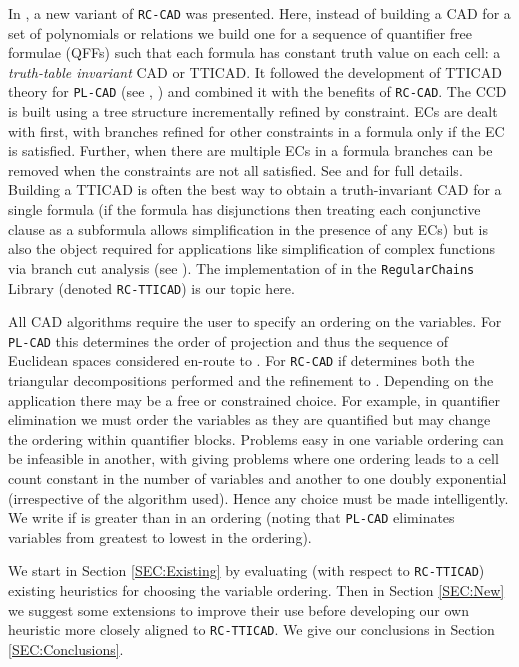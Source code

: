 \documentclass[runningheads,a4paper]{llncs}
\begin{document}
In \cite{BCDEMW14}, a new variant of \texttt{RC-CAD} was presented.  Here, instead of building a CAD for a set of polynomials or relations we build one for a sequence of quantifier free formulae (QFFs) such that each formula has constant truth value on each cell: a \textit{truth-table invariant} CAD or TTICAD.  It followed the development of TTICAD theory for \texttt{PL-CAD} (see \cite{BDEMW13}, \cite{BDEMW14}) and combined it with the benefits of \texttt{RC-CAD}.  
The CCD is built using a tree structure incrementally refined by constraint.  ECs are dealt with first, with branches refined for other constraints in a formula only if the EC is satisfied.  
Further, when there are multiple ECs in a formula branches can be removed when the constraints are not all satisfied.  See \cite{BCDEMW14} and \cite{CM12b} for full details.
Building a TTICAD is often the best way to obtain a truth-invariant CAD for a single formula (if the formula has disjunctions then treating each conjunctive clause as a subformula allows simplification in the presence of any ECs) but is also the object required for applications like simplification of complex functions via branch cut analysis (see \cite{BD02} \cite{EBDW13}).
The implementation of \cite{BCDEMW14} in the \texttt{RegularChains} Library \cite{RC} (denoted \texttt{RC-TTICAD}) is our topic here.

\vspace*{10pt}

All CAD algorithms require the user to specify an ordering on the variables.  For \texttt{PL-CAD} this determines the order of projection and thus the sequence of Euclidean spaces considered en-route to .  For \texttt{RC-CAD} if determines both the triangular decompositions performed and the refinement to .
Depending on the application there may be a free or constrained choice.  For example, in quantifier elimination we must order the variables as they are quantified but may change the ordering within quantifier blocks.  
Problems easy in one variable ordering can be infeasible in another, with \cite{BD07} giving problems where one ordering leads to a cell count constant in the number of variables and another to one doubly exponential (irrespective of the algorithm used).
Hence any choice must be made intelligently.
We write  if  is greater than  in an ordering (noting that \texttt{PL-CAD} eliminates variables from greatest to lowest in the ordering).

We start in Section \ref{SEC:Existing} by evaluating (with respect to \texttt{RC-TTICAD}) existing heuristics for choosing the variable ordering.  Then in Section \ref{SEC:New} we suggest some extensions to improve their use before developing our own heuristic more closely aligned to \texttt{RC-TTICAD}.  We give our conclusions in Section \ref{SEC:Conclusions}.
\end{document}
